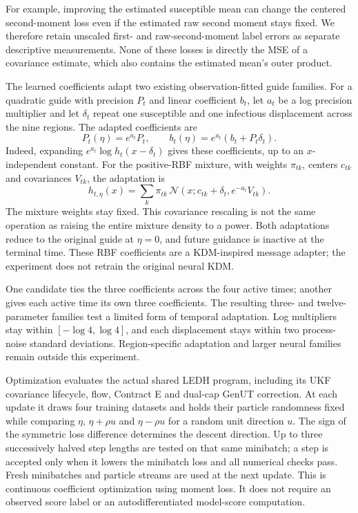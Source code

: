 For example, improving the estimated susceptible mean can change the centered
second-moment loss even if the estimated raw second moment stays fixed.
We therefore retain unscaled first- and raw-second-moment label errors as
separate descriptive measurements. None of these losses is directly the MSE
of a covariance estimate, which also contains the estimated mean's outer
product.

The learned coefficients adapt two existing observation-fitted guide families.
For a quadratic guide with precision $P_t$ and linear coefficient $b_t$,
let $a_t$ be a log precision multiplier and let $\delta_t$ repeat one
susceptible and one infectious displacement across the nine regions. The
adapted coefficients are
\begin{equation}
 P_t(\eta)=e^{a_t}P_t,\qquad
 b_t(\eta)=e^{a_t}(b_t+P_t\delta_t).
 \label{eq:sg-quadratic-adaptation}
\end{equation}
Indeed, expanding $e^{a_t}\log h_t(x-\delta_t)$ gives these coefficients,
up to an $x$-independent constant. For the positive-RBF mixture, with weights
$\pi_{tk}$, centers $c_{tk}$ and covariances $V_{tk}$, the adaptation is
\begin{equation}
 h_{t,\eta}(x)=\sum_k\pi_{tk}\,\mathcal N
       (x;c_{tk}+\delta_t,e^{-a_t}V_{tk}).
 \label{eq:sg-rbf-adaptation}
\end{equation}
The mixture weights stay fixed. This covariance rescaling is not the same
operation as raising the entire mixture density to a power. Both adaptations
reduce to the original guide at $\eta=0$, and future guidance is inactive at
the terminal time. These RBF coefficients are a KDM-inspired message adapter;
the experiment does not retrain the original neural KDM.

One candidate ties the three coefficients across the four active times;
another gives each active time its own three coefficients. The resulting
three- and twelve-parameter families test a limited form of temporal
adaptation. Log multipliers stay within $[-\log4,\log4]$, and each displacement
stays within two process-noise standard deviations. Region-specific
adaptation and larger neural families remain outside this experiment.

Optimization evaluates the actual shared LEDH program, including its UKF
covariance lifecycle, flow, Contract E and dual-cap GenUT correction. At each
update it draws four training datasets and holds their particle randomness
fixed while comparing $\eta$, $\eta+\rho u$ and $\eta-\rho u$ for a random
unit direction $u$. The sign of the symmetric loss difference determines
the descent direction. Up to three successively halved step lengths are
tested on that same minibatch; a step is accepted only when it lowers the
minibatch loss and all numerical checks pass. Fresh minibatches and particle
streams are used at the next update. This is continuous coefficient
optimization using moment loss. It does not require an observed score label
or an autodifferentiated model-score computation.


